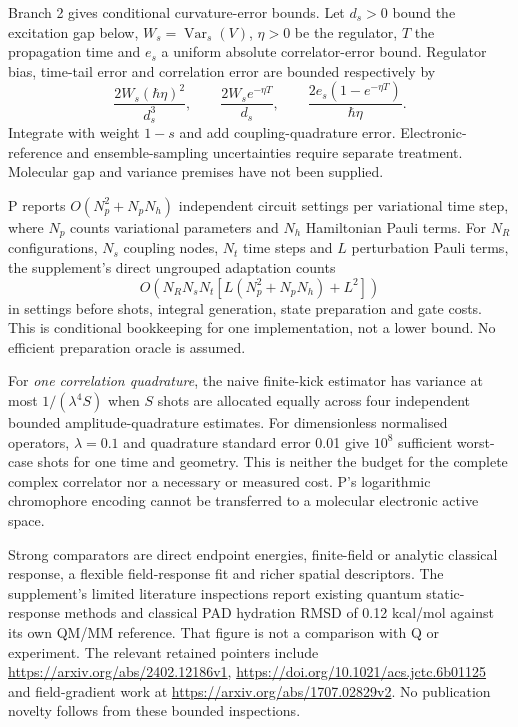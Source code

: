 \documentclass{article}
\begin{document}
Branch 2 gives conditional curvature-error bounds. Let $d_s>0$ bound the excitation gap below, $W_s=\operatorname{Var}_s(V)$, $\eta>0$ be the regulator, $T$ the propagation time and $e_s$ a uniform absolute correlator-error bound. Regulator bias, time-tail error and correlation error are bounded respectively by
\begin{equation*}
\frac{2W_s(\hbar\eta)^2}{d_s^3},\qquad
\frac{2W_s e^{-\eta T}}{d_s},\qquad
\frac{2e_s(1-e^{-\eta T})}{\hbar\eta}.
\end{equation*}
Integrate with weight $1-s$ and add coupling-quadrature error. Electronic-reference and ensemble-sampling uncertainties require separate treatment. Molecular gap and variance premises have not been supplied.

P reports $O(N_p^2+N_pN_h)$ independent circuit settings per variational time step, where $N_p$ counts variational parameters and $N_h$ Hamiltonian Pauli terms. For $N_R$ configurations, $N_s$ coupling nodes, $N_t$ time steps and $L$ perturbation Pauli terms, the supplement's direct ungrouped adaptation counts
\begin{equation*}
O\left(N_RN_sN_t\left[L(N_p^2+N_pN_h)+L^2\right]\right)
\end{equation*}
in settings before shots, integral generation, state preparation and gate costs. This is conditional bookkeeping for one implementation, not a lower bound. No efficient preparation oracle is assumed.

For \emph{one correlation quadrature}, the naive finite-kick estimator has variance at most $1/(\lambda^4S)$ when $S$ shots are allocated equally across four independent bounded amplitude-quadrature estimates. For dimensionless normalised operators, $\lambda=0.1$ and quadrature standard error 0.01 give $10^8$ sufficient worst-case shots for one time and geometry. This is neither the budget for the complete complex correlator nor a necessary or measured cost. P's logarithmic chromophore encoding cannot be transferred to a molecular electronic active space.

Strong comparators are direct endpoint energies, finite-field or analytic classical response, a flexible field-response fit and richer spatial descriptors. The supplement's limited literature inspections report existing quantum static-response methods and classical PAD hydration RMSD of 0.12 kcal/mol against its own QM/MM reference. That figure is not a comparison with Q or experiment. The relevant retained pointers include \url{https://arxiv.org/abs/2402.12186v1}, \url{https://doi.org/10.1021/acs.jctc.6b01125} and field-gradient work at \url{https://arxiv.org/abs/1707.02829v2}. No publication novelty follows from these bounded inspections.
\end{document}

